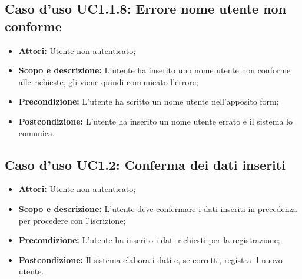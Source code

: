 \subsection{Caso d'uso UC1.1.8: Errore nome utente non conforme}
\begin{itemize}
	\item \textbf{Attori:} Utente non autenticato;
	\item \textbf{Scopo e descrizione:} L'utente ha inserito uno nome utente non conforme alle richieste, gli viene quindi comunicato l'errore;
	\item \textbf{Precondizione:} L'utente ha scritto un nome utente nell'apposito form;
	\item \textbf{Postcondizione:} L'utente ha inserito un nome utente errato e il sistema lo comunica.
\end{itemize}


\subsection{Caso d'uso UC1.2: Conferma dei dati inseriti}
\begin{itemize}
	\item \textbf{Attori:} Utente non autenticato;
	\item \textbf{Scopo e descrizione:} L'utente deve confermare i dati inseriti in precedenza per procedere con l'iscrizione;
	\item \textbf{Precondizione:} L'utente ha inserito i dati richiesti per la registrazione;
	\item \textbf{Postcondizione:} Il sistema elabora i dati e, se corretti, registra il nuovo utente.
\end{itemize}
